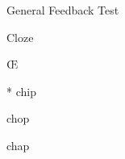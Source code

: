 \documentclass{article}
\begin{document}
\begin{quiz}[points=1]{General Feedback Test}
\begin{cloze}[feedback={54}]{Cloze}
\begin{multi}[shuffle=false,horizontal]
\OE
\item[feedback={yes}]* chip
\item[fraction=10] chop
\item[feedback={no.}] chap
\end{multi}

\end{cloze}

\end{quiz}
\end{document}
